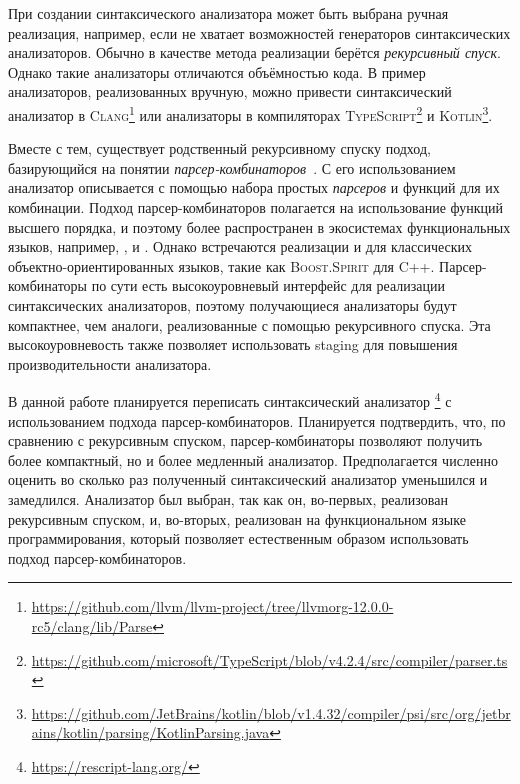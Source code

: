 
При создании синтаксического анализатора может быть выбрана ручная реализация,
например, если не хватает возможностей генераторов синтаксических анализаторов.
Обычно в качестве метода реализации берётся \emph{рекурсивный спуск}.
Однако такие анализаторы отличаются объёмностью кода.
В пример анализаторов, реализованных вручную, можно привести
синтаксический анализатор в
\textsc{Clang}\footnote{\url{https://github.com/llvm/llvm-project/tree/llvmorg-12.0.0-rc5/clang/lib/Parse}}
или анализаторы в компиляторах
\textsc{TypeScript}\footnote{\url{https://github.com/microsoft/TypeScript/blob/v4.2.4/src/compiler/parser.ts}}
и
\textsc{Kotlin}\footnote{\url{https://github.com/JetBrains/kotlin/blob/v1.4.32/compiler/psi/src/org/jetbrains/kotlin/parsing/KotlinParsing.java}}.

Вместе с тем, существует родственный рекурсивному спуску подход, базирующийся на понятии \emph{парсер-комбинаторов}~\cite{monparsing}.
С его использованием анализатор описывается с помощью набора простых \emph{парсеров} и функций для их комбинации.
Подход парсер-комбинаторов полагается на использование функций высшего порядка,
и поэтому более распространен в экосистемах функциональных языков, например, \haskell{}, \scala{} и \ocaml{}.
Однако встречаются реализации и для классических объектно-ориентированных языков, такие как \textsc{Boost.Spirit} для \textsc{C++}.
Парсер-комбинаторы по сути есть высокоуровневый интерфейс для реализации синтаксических анализаторов,
поэтому получающиеся анализаторы будут компактнее, чем аналоги, реализованные с помощью рекурсивного спуска.
Эта высокоуровневость также позволяет использовать staging для повышения производительности анализатора\cite{parsley2020}.

В данной работе планируется переписать синтаксический анализатор
\rescript\footnote{\url{https://rescript-lang.org/}} с использованием подхода парсер-комбинаторов.
Планируется подтвердить, что, по сравнению с рекурсивным спуском,
парсер-комбинаторы позволяют получить более компактный, но и более медленный анализатор.
Предполагается численно оценить во сколько раз полученный синтаксический анализатор уменьшился и замедлился.
Анализатор \rescript{} был выбран, так как он, во-первых, реализован рекурсивным спуском,
и, во-вторых, реализован на функциональном языке программирования,
который позволяет естественным образом использовать подход парсер-комбинаторов.
